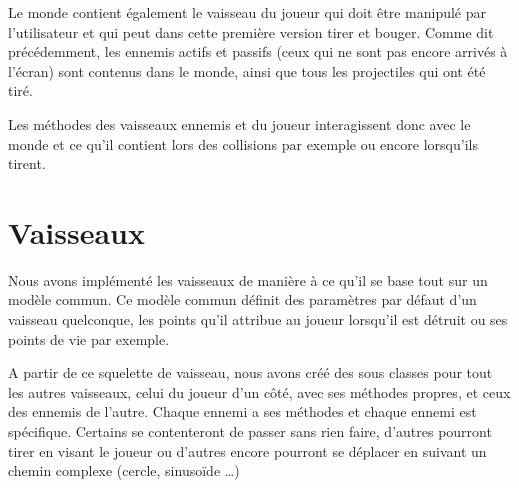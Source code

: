 \documentclass[a4paper, 12pt]{report}
\begin{document}
\noindent Le monde contient également le vaisseau du joueur qui doit être
manipulé par l'utilisateur et qui peut dans cette première version tirer et
bouger. Comme dit précédemment, les ennemis actifs et passifs (ceux qui ne sont
pas encore arrivés à l'écran) sont contenus dans le monde, ainsi que tous les
projectiles qui ont été tiré. \newline

\noindent Les méthodes des vaisseaux ennemis et du joueur interagissent donc
avec le monde et ce qu'il contient lors des collisions par exemple ou encore
lorsqu'ils tirent.

%
%
%

\section{Vaisseaux}

Nous avons implémenté les vaisseaux de manière à ce qu'il se base tout
sur un modèle commun. Ce modèle commun définit des paramètres par défaut d'un
vaisseau quelconque, les points qu'il attribue au joueur lorsqu'il est détruit
ou ses points de vie par exemple.\newline

\noindent A partir de ce squelette de vaisseau, nous avons créé des sous
classes pour tout les autres vaisseaux, celui du joueur d'un côté, avec ses
méthodes propres, et ceux des ennemis de l'autre. Chaque ennemi a ses méthodes
et chaque ennemi est spécifique. Certains se contenteront de passer sans rien
faire, d'autres pourront tirer en visant le joueur ou d'autres encore pourront
se déplacer en suivant un chemin complexe (cercle, sinusoïde \ldots)\newline
\end{document}
